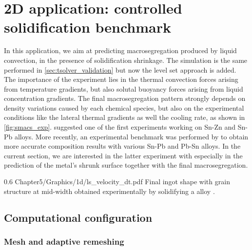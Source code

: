 \section{2D application: controlled solidification benchmark}
In this application, we aim at predicting macrosegregation produced by liquid convection, in the presence of solidification shrinkage.
The simulation is the same performed in \cref{sec:tsolver_validation} but now the level set approach is added.
The importance of the experiment lies in the 
thermal convection forces arising from temperature gradients, but also solutal buoyancy forces arising from liquid concentration gradients. The final macrosegregation pattern
strongly depends on density variations caused by each chemical species, but also on the experimental conditions like the lateral thermal gradients as well the cooling rate,
as shown in \cref{fig:smacs_exp}.
\citet{hebditch_observations_1974} suggested one of the first experiments working on Sn-Zn and Sn-Pb alloys. 
More recently, an experimental benchmark was performed by \citet{hachani_experimental_2012} to obtain more accurate 
composition results with various Sn-Pb and Pb-Sn alloys. In the current section, we are interested in the latter experiment with  especially in the prediction
of the metal's shrunk surface together with the final macrosegregation.

\begin{figureth}
{0.6}
{Chapter5/Graphics/1d/ls_velocity_dt.pdf}
{Final ingot shape with grain structure at mid-width obtained experimentally by solidifying a  alloy \citep{carozzani_direct_2013}.}
\label{fig:smacs_exp}
\end{figureth}

\subsection{Computational configuration}

\subsubsection{Mesh and adaptive remeshing}

